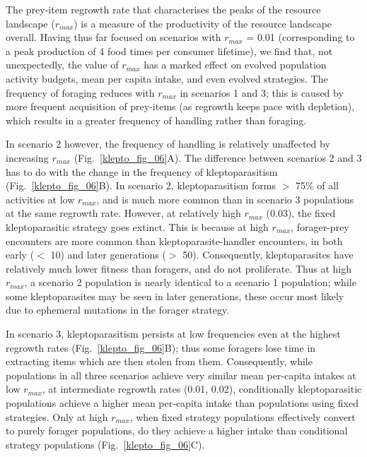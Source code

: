 The prey-item regrowth rate that characterises the peaks of the resource landscape ($r_{max}$) is a measure of the productivity of the resource landscape overall. 
Having thus far focused on scenarios with $r_{max}$ = 0.01 (corresponding to a peak production of 4 food times per consumer lifetime), we find that, not unexpectedly, the value of $r_{max}$ has a marked effect on evolved population activity budgets, mean per capita intake, and even evolved strategies.
The frequency of foraging reduces with $r_{max}$ in scenarios 1 and 3; this is caused by more frequent acquisition of prey-items (as regrowth keeps pace with depletion), which results in a greater frequency of handling rather than foraging.

In scenario 2 however, the frequency of handling is relatively unaffected by increasing $r_{max}$ (Fig.~\ref{klepto_fig_06}A).
The difference between scenarios 2 and 3 has to do with the change in the frequency of kleptoparasitism (Fig.~\ref{klepto_fig_06}B).
In scenario 2, kleptoparasitism forms $>$ 75\% of all activities at low $r_{max}$, and is much more common than in scenario 3 populations at the same regrowth rate.
However, at relatively high $r_{max}$ (0.03), the fixed kleptoparasitic strategy goes extinct.
This is because at high $r_{max}$, forager-prey encounters are more common than kleptoparasite-handler encounters, in both early ($<$ 10) and later generations ($>$ 50).
Consequently, kleptoparasites have relatively much lower fitness than foragers, and do not proliferate.
Thus at high $r_{max}$, a scenario 2 population is nearly identical to a scenario 1 population; while some kleptoparasites may be seen in later generations, these occur most likely due to ephemeral mutations in the forager strategy.

In scenario 3, kleptoparasitism persists at low frequencies even at the highest regrowth rates (Fig.~\ref{klepto_fig_06}B); thus some foragers lose time in extracting items which are then stolen from them.
Consequently, while populations in all three scenarios achieve very similar mean per-capita intakes at low $r_{max}$, at intermediate regrowth rates (0.01, 0.02), conditionally kleptoparasitic populations achieve a higher mean per-capita intake than populations using fixed strategies.
Only at high $r_{max}$, when fixed strategy populations effectively convert to purely forager populations, do they achieve a higher intake than conditional strategy populations (Fig.~\ref{klepto_fig_06}C).

